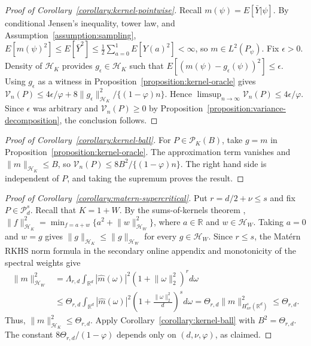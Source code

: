 \documentclass[letterpaper,12pt]{article}
\theoremstyle{definition}
\numberwithin{equation}{section}
\newcommand{\mc}{\mathcal}
\newcommand{\ylevel}{\bar Y}
\newcommand{\norm}[1]{\lVert#1\rVert}
\begin{document}
\begin{proof}[Proof of Corollary~\ref{corollary:kernel-pointwise}]
Recall $m(\psi)=E[\ylevel|\psi]$. By conditional Jensen's inequality, tower law, and Assumption~\ref{assumption:sampling}, $E[m(\psi)^2]\leq E[\ylevel^2]\leq\frac12\sum_{a=0}^1E[Y(a)^2]<\infty$, so $m\in L^2(P_\psi)$. Fix $\epsilon>0$. Density of $\mc H_K$ provides $g_\epsilon\in\mc H_K$ such that $E[(m(\psi)-g_\epsilon(\psi))^2]\leq\epsilon$. Using $g_\epsilon$ as a witness in Proposition~\ref{proposition:kernel-oracle} gives $\mc V_n(P)\leq4\epsilon/\varphi+8\norm{g_\epsilon}_{\mc H_K}^2/\{(1-\varphi)n\}$. Hence $\limsup_{n\to\infty}\mc V_n(P)\leq4\epsilon/\varphi$. Since $\epsilon$ was arbitrary and $\mc V_n(P)\geq0$ by Proposition~\ref{proposition:variance-decomposition}, the conclusion follows.
\end{proof}

\begin{proof}[Proof of Corollary~\ref{corollary:kernel-ball}]
For $P\in\mc P_K(B)$, take $g=m$ in Proposition~\ref{proposition:kernel-oracle}. The approximation term vanishes and $\norm{m}_{\mc H_K}\leq B$, so $\mc V_n(P)\leq8B^2/\{(1-\varphi)n\}$. The right hand side is independent of $P$, and taking the supremum proves the result.
\end{proof}

\begin{proof}[Proof of Corollary~\ref{corollary:matern-supercritical}]
Put $r=d/2+\nu\leq s$ and fix $P\in\mc P_d^s$.
Recall that $K=1+W$. By the sums-of-kernels theorem \citep[Theorem~5.4]{paulsen2016rkhs}, $\norm{f}_{\mc H_K}^2=\min_{f=a+w}\{a^2+\norm{w}_{\mc H_W}^2\}$, where $a\in\mathbb R$ and $w\in\mc H_W$. Taking $a=0$ and $w=g$ gives $\norm{g}_{\mc H_K}\leq\norm{g}_{\mc H_W}$ for every $g\in\mc H_W$. Since $r\leq s$, the Mat\'ern RKHS norm formula in the secondary online appendix and monotonicity of the spectral weights give
\begin{align*}
\norm{m}_{\mc H_W}^2&=\Lambda_{r,d}\int_{\mathbb R^d}|\widehat m(\omega)|^2(1+\norm{\omega}_2^2)^r d\omega\\
&\leq\Theta_{r,d}\int_{\mathbb R^d}|\widehat m(\omega)|^2\left(1+\frac{\norm{\omega}_2^2}{d}\right)^s d\omega=\Theta_{r,d}\norm{m}_{H_{\mathrm{av}}^s(\mathbb R^d)}^2\leq\Theta_{r,d}.
\end{align*}
Thus, $\norm{m}_{\mc H_K}^2\leq\Theta_{r,d}$. Apply Corollary~\ref{corollary:kernel-ball} with $B^2=\Theta_{r,d}$. The constant $8\Theta_{r,d}/(1-\varphi)$ depends only on $(d,\nu,\varphi)$, as claimed.
\end{proof}
\end{document}
